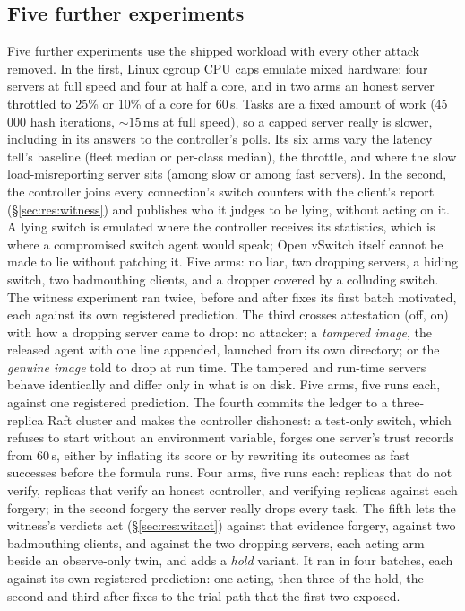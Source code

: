 \documentclass[10pt,twocolumn,letterpaper]{article}
\begin{document}
\subsection{Five further experiments}
\label{sec:method:hw}
Five further experiments use the shipped workload with every other attack
removed. In the first, Linux cgroup CPU caps emulate mixed hardware: four
servers at full speed and four at half a core, and in two arms an honest
server throttled to 25\% or 10\% of a core for 60\,s. Tasks are a fixed
amount of work (45\,000 hash iterations, ${\sim}15$\,ms at full speed), so a
capped server really is slower, including in its answers to the controller's
polls. Its six arms vary the latency tell's baseline (fleet median or
per-class median), the throttle, and where the slow load-misreporting server
sits (among slow or among fast servers). In the second, the controller joins
every connection's switch counters with the client's report
(\S\ref{sec:res:witness}) and publishes who it judges to be lying, without
acting on it. A lying switch is emulated where the controller receives its
statistics, which is where a compromised switch agent would speak; Open
vSwitch itself cannot be made to lie without patching it. Five arms: no
liar, two dropping servers, a hiding switch, two badmouthing clients, and a
dropper covered by a colluding switch. The witness experiment ran twice,
before and after fixes its first batch motivated, each against its own
registered prediction. The third crosses attestation (off, on) with how a
dropping server came to drop: no attacker; a \emph{tampered image}, the
released agent with one line appended, launched from its own directory; or
the \emph{genuine image} told to drop at run time. The tampered and run-time
servers behave identically and differ only in what is on disk. Five arms,
five runs each, against one registered prediction. The fourth commits the
ledger to a three-replica Raft cluster and makes the controller dishonest: a
test-only switch, which refuses to start without an environment variable,
forges one server's trust records from 60\,s, either by inflating its score
or by rewriting its outcomes as fast successes before the formula runs. Four
arms, five runs each: replicas that do not verify, replicas that verify an
honest controller, and verifying replicas against each forgery; in the second
forgery the server really drops every task. The fifth lets the witness's
verdicts act (\S\ref{sec:res:witact}) against that evidence forgery, against
two badmouthing clients, and against the two dropping servers, each acting arm
beside an observe-only twin, and adds a \emph{hold} variant. It ran in four
batches, each against its own registered prediction: one acting, then three of
the hold, the second and third after fixes to the trial path that the first
two exposed.
\end{document}
